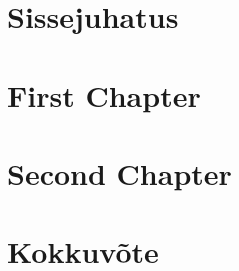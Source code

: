\chapter{Sissejuhatus}\label{chapter:introduction}


\chapter{First Chapter}\label{chapter:first_chapter}


\chapter{Second Chapter}\label{chapter:second_chapter}


\chapter{Kokkuvõte}\label{chapter:summary} 

